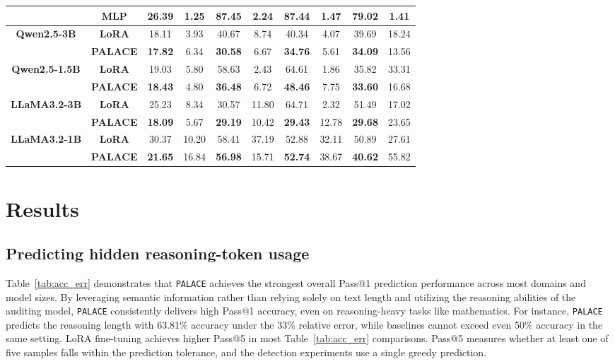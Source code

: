 \documentclass[pdflatex,sn-mathphys-num]{sn-jnl}%
\newcommand{\n}{\texttt{PALACE}\xspace}
\theoremstyle{thmstyleone}%
\theoremstyle{thmstyletwo}%
\theoremstyle{thmstylethree}%
\begin{document}
\begin{table}[t]
{\begin{tabular}{cc|cc|cc|cc|cc}
\midrule
& \textbf{MLP} & 26.39 & 1.25 & 87.45 & 2.24 &87.44 &1.47 & 79.02 & 1.41 \\
\midrule
\multirow{2}{*}{\textbf{Qwen2.5-3B}}
& \textbf{LoRA} & 18.11 & 3.93 & 40.67 & 8.74 & 40.34 & 4.07 & 39.69 & 18.24 \\
& \textbf{PALACE} &\textbf{17.82}&6.34&\textbf{30.58}&6.67&\textbf{34.76}&5.61&\textbf{34.09}&13.56\\
\midrule
\multirow{2}{*}{\textbf{Qwen2.5-1.5B}}
& \textbf{LoRA} &19.03&5.80&58.63&2.43& 64.61 & 1.86 & 35.82 & 33.31 \\
& \textbf{PALACE} & \textbf{18.43} & 4.80 & \textbf{36.48} & 6.72 & \textbf{48.46} & 7.75 & \textbf{33.60} & 16.68 \\
\midrule
\multirow{2}{*}{\textbf{LLaMA3.2-3B}}
& \textbf{LoRA} &25.23&8.34&30.57&11.80&64.71&2.32&51.49&17.02\\
& \textbf{PALACE} &\textbf{18.09}&5.67&\textbf{29.19}&10.42&\textbf{29.43}&12.78&\textbf{29.68}&23.65\\
\midrule
\multirow{2}{*}{\textbf{LLaMA3.2-1B}}
& \textbf{LoRA} &30.37&10.20&58.41&37.19&52.88&32.11&50.89&27.61\\
& \textbf{PALACE} &\textbf{21.65}&16.84&\textbf{56.98}&15.71&\textbf{52.74}&38.67&\textbf{40.62}&55.82\\
\bottomrule
\end{tabular}}
\vspace{-2mm}
\end{table}

\section{Results}

\subsection{Predicting hidden reasoning-token usage}

Table~\ref{tab:acc_err} demonstrates that {\n} achieves the strongest
overall Pass@1 prediction performance across most domains and model sizes. By leveraging semantic information rather than relying solely on text length and utilizing the reasoning abilities of the auditing model, {\n} consistently delivers high Pass@1 accuracy, even on reasoning-heavy tasks like mathematics. For instance, {\n} predicts the reasoning length with 63.81\% accuracy under the 33\% relative error, while baselines cannot exceed even 50\% accuracy in the same setting.
LoRA fine-tuning achieves higher Pass@5 in most Table~\ref{tab:acc_err} comparisons. Pass@5 measures whether at least one of five samples falls within the prediction tolerance, and the detection experiments use a single greedy prediction.
\end{document}
